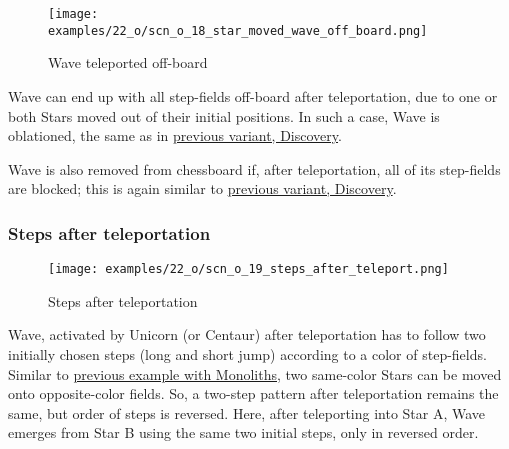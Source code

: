 \clearpage %

\vspace*{-2.1\baselineskip}
\noindent
\begin{figure}[!h]
\texttt{[image: examples/22\_o/scn\_o\_18\_star\_moved\_wave\_off\_board.png]}
\caption{Wave teleported off-board}
\label{fig:scn_o_18_star_moved_wave_off_board}
\end{figure}

Wave can end up with all step-fields off-board after teleportation, due to one or
both Stars moved out of their initial positions. In such a case, Wave is oblationed,
the same as in
\hyperref[fig:scn_d_12_wave_teleported_off_board]{previous variant, Discovery}.

Wave is also removed from chessboard if, after teleportation, all of its step-fields
are blocked; this is again similar to
\hyperref[fig:scn_d_11_teleported_wave_blocked]{previous variant, Discovery}.

\clearpage %

\subsubsection*{Steps after teleportation}

\vspace*{-1.5\baselineskip}
\noindent
\begin{figure}[!h]
\texttt{[image: examples/22\_o/scn\_o\_19\_steps\_after\_teleport.png]}
\vspace*{-1.4\baselineskip}
\caption{Steps after teleportation}
\label{fig:scn_o_19_steps_after_teleport}
\end{figure}

\vspace*{-0.5\baselineskip}
Wave, activated by Unicorn (or Centaur) after teleportation has to follow two initially
chosen steps (long and short jump) according to a color of step-fields. Similar to
\hyperref[fig:scn_d_15_steps_after_teleport_init]{previous example with Monoliths},
two same-color Stars can be moved onto opposite-color fields. So, a two-step pattern
after teleportation remains the same, but order of steps is reversed. Here, after
teleporting into Star A, Wave emerges from Star B using the same two initial steps,
only in reversed order.

